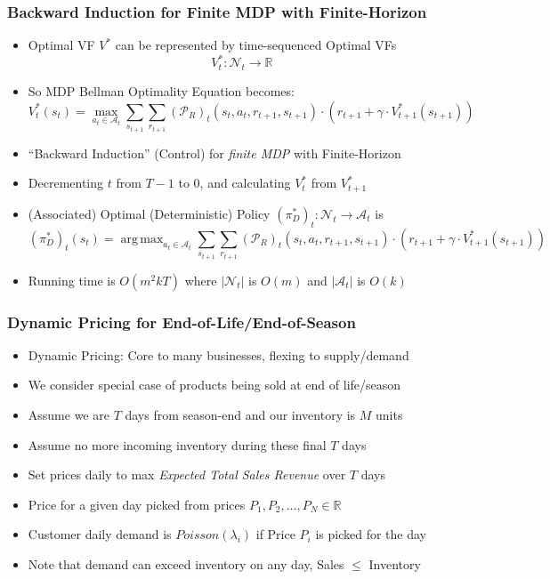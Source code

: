 \documentclass[handout]{beamer}
\DeclareMathOperator*{\argmax}{arg\,max}
\begin{document}
\begin{frame}
\frametitle{Backward Induction for Finite MDP with Finite-Horizon}
\pause
\begin{itemize}[<+->]
\item Optimal VF $V^*$ can be represented by time-sequenced Optimal VFs
$$V^*_t: \mathcal{N}_t \rightarrow \mathbb{R}$$
\item So MDP Bellman Optimality Equation becomes: 
$$V^*_t(s_t) = \max_{a_t \in \mathcal{A}_t} \sum_{s_{t+1}} \sum_{r_{t+1}} (\mathcal{P}_R)_t(s_t, a_t, r_{t+1}, s_{t+1}) \cdot (r_{t+1} + \gamma \cdot V^*_{t+1}(s_{t+1}))$$
\item ``Backward Induction'' (Control) for {\em finite MDP} with Finite-Horizon
\item Decrementing $t$ from $T-1$ to 0, and calculating $V_t^*$ from $V_{t+1}^*$
\item (Associated) Optimal (Deterministic) Policy $(\pi^*_D)_t: \mathcal{N}_t \rightarrow \mathcal{A}_t$ is
$$(\pi^*_D)_t(s_t) = \argmax_{a_t \in \mathcal{A}_t} \sum_{s_{t+1}} \sum_{r_{t+1}} (\mathcal{P}_R)_t(s_t, a_t, r_{t+1}, s_{t+1}) \cdot (r_{t+1} + \gamma \cdot V^*_{t+1}(s_{t+1}))$$
\item Running time is $O(m^2 k T)$ where $|\mathcal{N}_t|$ is $O(m)$ and $|\mathcal{A}_t|$ is $O(k)$
\end{itemize}
\end{frame}

\begin{frame}
\frametitle{Dynamic Pricing for End-of-Life/End-of-Season}
\pause
\begin{itemize}[<+->]
\item Dynamic Pricing: Core to many businesses, flexing to supply/demand
\item We consider special case of products being sold at end of life/season
\item Assume we are $T$ days from season-end and our inventory is $M$ units
\item Assume no more incoming inventory during these final $T$ days
\item Set prices daily to max {\em Expected Total Sales Revenue} over $T$ days
\item Price for a given day picked from prices $P_1, P_2, \ldots, P_N \in \mathbb{R}$
\item Customer daily demand is $Poisson(\lambda_i)$ if Price $P_i$ is picked for the day
\item Note that demand can exceed inventory on any day, Sales $\leq$ Inventory
\end{itemize}
\end{frame}
\end{document}
